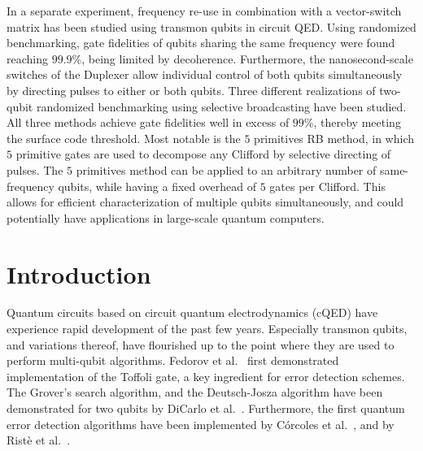 \documentclass[12pt]{report}
\newcommand\blankpage{%
    \null
    \thispagestyle{empty}%
    \addtocounter{page}{-1}%
    \newpage}
\begin{document}
In a separate experiment, frequency re-use in combination with a vector-switch matrix has been studied using transmon qubits in circuit QED. Using randomized benchmarking, gate fidelities of qubits sharing the same frequency were found reaching $99.9\%$, being limited by decoherence. Furthermore, the nanosecond-scale switches of the Duplexer allow individual control of both qubits simultaneously by directing pulses to either or both qubits. Three different realizations of two-qubit randomized benchmarking using selective broadcasting have been studied. All three methods achieve gate fidelities well in excess of $99\%$, thereby meeting the surface code threshold. Most notable is the $5$ primitives RB method, in which $5$ primitive gates are used to decompose any Clifford by selective directing of pulses. The $5$ primitives method can be applied to an arbitrary number of same-frequency qubits, while having a fixed overhead of $5$ gates per Clifford. This allows for efficient characterization of multiple qubits simultaneously, and could potentially have applications in large-scale quantum computers.
\blankpage
\blankpage
\tableofcontents
\newpage

\sectionfont{\scshape}



\chapter{Introduction}

  Quantum circuits based on circuit quantum electrodynamics (cQED) have experience rapid development of the past few years. Especially transmon qubits, and variations thereof, have flourished up to the point where they are used to perform multi-qubit algorithms. Fedorov et al.~\cite{fedorov2011implementation} first demonstrated implementation of the Toffoli gate, a key ingredient for error detection schemes. The Grover's search algorithm, and the Deutsch-Josza algorithm have been demonstrated for two qubits by DiCarlo et al.~\cite{dicarlo2009demonstration}. Furthermore, the first quantum error detection algorithms have been implemented by C\'orcoles et al.~\cite{corcoles2015demonstration}, and by Rist\`e et al.~\cite{riste2014detecting}.
\end{document}
